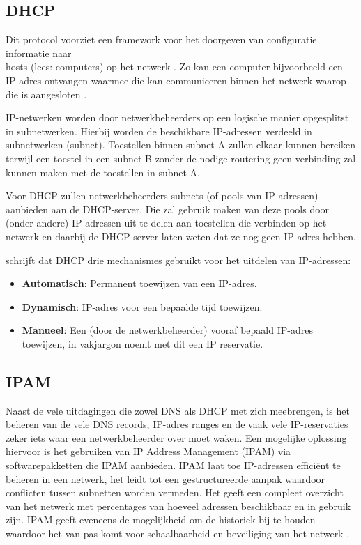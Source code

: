 \documentclass{hogent-article}
\begin{document}
\subsection{DHCP}
Dit protocol voorziet een framework voor het doorgeven van configuratie informatie naar \\hosts (lees: computers) op het netwerk . Zo kan een computer bijvoorbeeld een IP-adres ontvangen waarmee die kan communiceren binnen het netwerk waarop die is aangesloten \autocite{Droms1997}.

IP-netwerken worden door netwerkbeheerders op een logische manier opgesplitst in subnetwerken. Hierbij worden de beschikbare IP-adressen verdeeld in subnetwerken (subnet). Toestellen binnen subnet A zullen elkaar kunnen bereiken terwijl een toestel in een subnet B zonder de nodige routering geen verbinding zal kunnen maken met de toestellen in subnet A.

Voor DHCP zullen netwerkbeheerders subnets (of pools van IP-adressen) aanbieden aan de DHCP-server. Die zal gebruik maken van deze pools door (onder andere) IP-adressen uit te delen aan toestellen die verbinden op het netwerk en daarbij de DHCP-server laten weten dat ze nog geen IP-adres hebben.

\textcite{Droms1997} schrijft dat DHCP drie mechanismes gebruikt voor het uitdelen van IP-adressen:
\begin{itemize}
    \item \textbf{Automatisch}: Permanent toewijzen van een IP-adres.
    \item \textbf{Dynamisch}: IP-adres voor een bepaalde tijd toewijzen.
    \item \textbf{Manueel}: Een (door de netwerkbeheerder) vooraf bepaald IP-adres toewijzen, in vakjargon noemt met dit een IP reservatie.
\end{itemize}

\subsection{IPAM}
Naast de vele uitdagingen die zowel DNS als DHCP met zich meebrengen, is het beheren van de vele DNS records, IP-adres ranges en de vaak vele IP-reservaties zeker iets waar een netwerkbeheerder over moet waken. 
Een mogelijke oplossing hiervoor is het gebruiken van IP Address Management (IPAM) via softwarepakketten die IPAM aanbieden.
IPAM laat toe IP-adressen efficiënt te beheren in een netwerk, het leidt tot een gestructureerde aanpak waardoor conflicten tussen subnetten worden vermeden. Het geeft een compleet overzicht van het netwerk met percentages van hoeveel adressen beschikbaar en in gebruik zijn. IPAM geeft eveneens de mogelijkheid om de historiek bij te houden waardoor het van pas komt voor schaalbaarheid en beveiliging van het netwerk \autocite{Rooney2020}.
\end{document}
